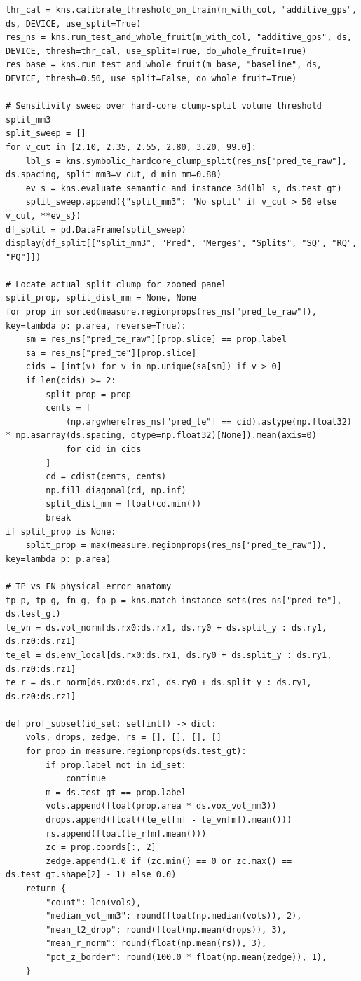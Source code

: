\documentclass[10pt,a4paper]{article}
\renewcommand{\_}{\origunderscore\allowbreak}
\begin{document}
\begin{codebox}
\begin{lstlisting}[style=pybmed]
thr_cal = kns.calibrate_threshold_on_train(m_with_col, "additive_gps", ds, DEVICE, use_split=True)
res_ns = kns.run_test_and_whole_fruit(m_with_col, "additive_gps", ds, DEVICE, thresh=thr_cal, use_split=True, do_whole_fruit=True)
res_base = kns.run_test_and_whole_fruit(m_base, "baseline", ds, DEVICE, thresh=0.50, use_split=False, do_whole_fruit=True)

# Sensitivity sweep over hard-core clump-split volume threshold split_mm3
split_sweep = []
for v_cut in [2.10, 2.35, 2.55, 2.80, 3.20, 99.0]:
    lbl_s = kns.symbolic_hardcore_clump_split(res_ns["pred_te_raw"], ds.spacing, split_mm3=v_cut, d_min_mm=0.88)
    ev_s = kns.evaluate_semantic_and_instance_3d(lbl_s, ds.test_gt)
    split_sweep.append({"split_mm3": "No split" if v_cut > 50 else v_cut, **ev_s})
df_split = pd.DataFrame(split_sweep)
display(df_split[["split_mm3", "Pred", "Merges", "Splits", "SQ", "RQ", "PQ"]])

# Locate actual split clump for zoomed panel
split_prop, split_dist_mm = None, None
for prop in sorted(measure.regionprops(res_ns["pred_te_raw"]), key=lambda p: p.area, reverse=True):
    sm = res_ns["pred_te_raw"][prop.slice] == prop.label
    sa = res_ns["pred_te"][prop.slice]
    cids = [int(v) for v in np.unique(sa[sm]) if v > 0]
    if len(cids) >= 2:
        split_prop = prop
        cents = [
            (np.argwhere(res_ns["pred_te"] == cid).astype(np.float32) * np.asarray(ds.spacing, dtype=np.float32)[None]).mean(axis=0)
            for cid in cids
        ]
        cd = cdist(cents, cents)
        np.fill_diagonal(cd, np.inf)
        split_dist_mm = float(cd.min())
        break
if split_prop is None:
    split_prop = max(measure.regionprops(res_ns["pred_te_raw"]), key=lambda p: p.area)

# TP vs FN physical error anatomy
tp_p, tp_g, fn_g, fp_p = kns.match_instance_sets(res_ns["pred_te"], ds.test_gt)
te_vn = ds.vol_norm[ds.rx0:ds.rx1, ds.ry0 + ds.split_y : ds.ry1, ds.rz0:ds.rz1]
te_el = ds.env_local[ds.rx0:ds.rx1, ds.ry0 + ds.split_y : ds.ry1, ds.rz0:ds.rz1]
te_r = ds.r_norm[ds.rx0:ds.rx1, ds.ry0 + ds.split_y : ds.ry1, ds.rz0:ds.rz1]

def prof_subset(id_set: set[int]) -> dict:
    vols, drops, zedge, rs = [], [], [], []
    for prop in measure.regionprops(ds.test_gt):
        if prop.label not in id_set:
            continue
        m = ds.test_gt == prop.label
        vols.append(float(prop.area * ds.vox_vol_mm3))
        drops.append(float((te_el[m] - te_vn[m]).mean()))
        rs.append(float(te_r[m].mean()))
        zc = prop.coords[:, 2]
        zedge.append(1.0 if (zc.min() == 0 or zc.max() == ds.test_gt.shape[2] - 1) else 0.0)
    return {
        "count": len(vols),
        "median_vol_mm3": round(float(np.median(vols)), 2),
        "mean_t2_drop": round(float(np.mean(drops)), 3),
        "mean_r_norm": round(float(np.mean(rs)), 3),
        "pct_z_border": round(100.0 * float(np.mean(zedge)), 1),
    }


\end{lstlisting}
\end{codebox}
\end{document}
